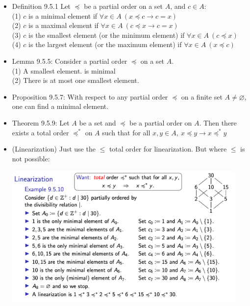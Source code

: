 \documentclass{article}
\begin{document}
\begin{itemize}
\begin{center}
        \end{center}
    \item Definition 9.5.1 Let $\preccurlyeq$ be a partial order on a set $A$, and $c\in A$:
        \\ \hspace*{3mm} (1) $c$ is a minimal element if $\forall x\in A\ (x\preccurlyeq c \xrightarrow{}c=x)$
        \\ \hspace*{3mm} (2) $c$ is a maximal element if $\forall x\in A\ (c \preccurlyeq x \xrightarrow{} c=x)$
        \\ \hspace*{3mm} (3) $c$ is the smallest element (or the minimum element) if $\forall x\in A\ (c \preccurlyeq x)$
        \\ \hspace*{3mm} (4) $c$ is the largest element (or the maximum element) if $\forall x\in A\ (x \preccurlyeq c)$
    \item Lemma 9.5.5: Consider a partial order $\preccurlyeq$ on a set $A$.
        \\ \hspace*{3mm} (1) A smallest element. is minimal
        \\ \hspace*{3mm} (2) There is at most one smallest element.
    \item Proposition 9.5.7: With respect to any partial order $\preccurlyeq$ on a finite set $A\neq \varnothing$, one can find a minimal element.
    \item Theorem 9.5.9: Let $A$ be a set and $\preccurlyeq$ be a partial order on $A$. Then there exists a total order $\preccurlyeq^*$ on $A$ such that for all $x,y\in A,\ x\preccurlyeq y \xrightarrow{} x\preccurlyeq^* y$
    \item (Linearization) Just use the $\leqslant$ total order for linearization. But where $\leqslant$ is not possible:
        \begin{center}
            \includegraphics[width=12cm]{images/linearization.png}

\end{center}
\end{itemize}
\end{document}
